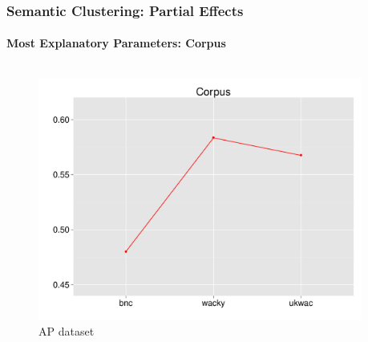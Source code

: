 \documentclass[t]{beamer} %
\begin{document}
\begin{frame}
\begin{columns}
\begin{column}{0.5\textwidth}
    \end{column}
  \end{columns}  
  
\end{frame}

\begin{frame}
  \frametitle{Semantic Clustering: Partial Effects}
  \framesubtitle{Most Explanatory Parameters: Corpus}

  \vspace{-18pt}

  \begin{columns}
    
    \begin{column}{0.5\textwidth}
      \begin{figure} 
        \hspace*{-18pt} 
        \includegraphics[scale=0.30]{img/lapesa_ap_main_corpus}
        \vspace{-10pt}
        \caption{AP dataset}
      \end{figure}
    \end{column}

    \begin{column}{0.5\textwidth}
      \centering
      

\end{column}
\end{columns}
\end{frame}
\end{document}
